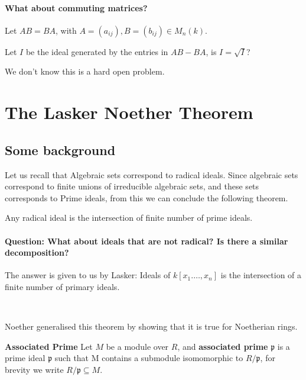 \paragraph*{What about commuting matrices?}
\begin{example}
    Let $AB=BA$, with $A=(a_{ij}),B=(b_{ij})\in M_n(k)$.

    Let $I$ be the ideal generated by the entries in $AB-BA$, is $I = \sqrt{I}$?

    We don't know this is a hard open problem.
\end{example}

\section{The Lasker Noether Theorem}

\subsection{Some background}

Let us recall that Algebraic sets correspond to radical ideals. Since algebraic sets correspond to finite unions of irreducible algebraic sets, and these sets corresponds to Prime ideals, from this we can conclude the following theorem.

\begin{theorem}
    Any radical ideal is the intersection of finite number of prime ideals.
\end{theorem}

\paragraph*{Question: What about ideals that are not radical? Is there a similar decomposition?}

The answer is given to us by Lasker: Ideals of $k[x_1.\dots,x_n]$ is the intersection of a finite number of primary ideals.

\

Noether generalised this theorem by showing that it is true for Noetherian rings.

\begin{definition}\textbf{Associated Prime}
    Let $M$ be a module over $R$, and \textbf{associated prime }$\mathfrak{p}$ is a prime ideal $\mathfrak{p}$ such that M contains a submodule isomomorphic to $R/\mathfrak{p}$, for brevity we write $R/\mathfrak{p}\subseteq M$.
\end{definition}

